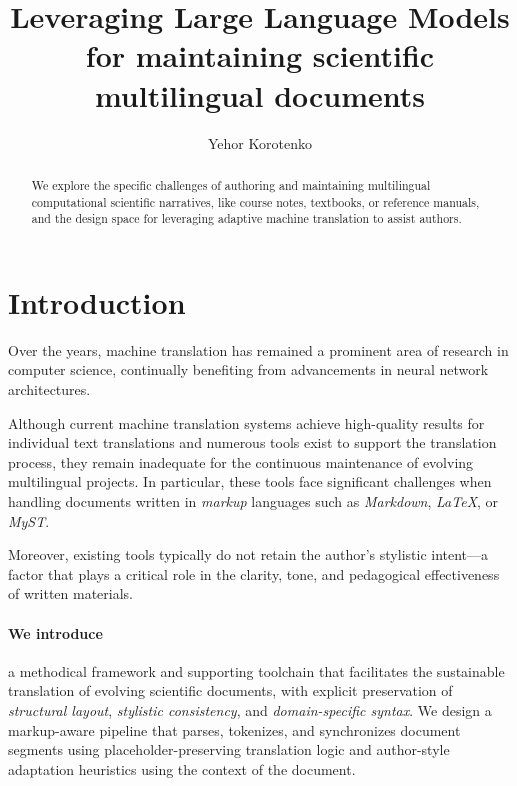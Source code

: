 \documentclass[runningheads]{llncs}
\begin{document}
%
\title{Leveraging Large Language Models for maintaining scientific multilingual documents}
%
%
\author{Yehor Korotenko}
%
%
%
\maketitle              %
%
\begin{abstract}
We explore the specific challenges of authoring and maintaining multilingual
computational scientific narratives, like course notes, textbooks, or reference
manuals, and the design space for leveraging adaptive machine translation to
assist authors.
\end{abstract}
%
%
%
\section{Introduction}
Over the years, machine translation has remained a prominent area of research
in computer science, continually benefiting from advancements in neural network
architectures. 

Although current machine translation systems achieve
high-quality results for individual text translations and numerous tools exist
to support the translation process, they remain inadequate for the continuous
maintenance of evolving multilingual projects. In particular, these tools face
significant challenges when handling documents written in \textit{markup} languages such
as \textit{Markdown}, \textit{LaTeX}, or \textit{MyST}.

Moreover, existing tools typically do not retain the author’s stylistic
intent—a factor that plays a critical role in the clarity, tone, and
pedagogical effectiveness of written materials.

\paragraph{We introduce} a methodical framework and supporting toolchain that
facilitates the sustainable translation of evolving scientific documents, with
explicit preservation of \textit{structural layout}, \textit{stylistic
consistency}, and \textit{domain-specific syntax}. We design a markup-aware
pipeline that parses, tokenizes, and synchronizes document segments using
placeholder-preserving translation logic and author-style adaptation
heuristics using the context of the document.
\end{document}
